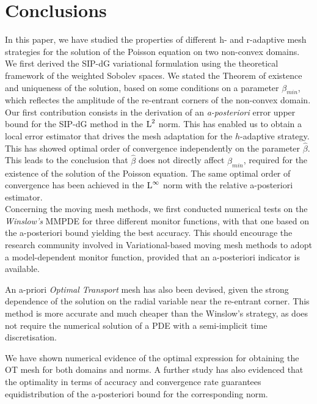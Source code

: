 \documentclass[a4paper,11pt]{article}
\begin{document}
{\clearpage
\newpage

\section{Conclusions}
\label{sec:Conclusion}

In this paper, we have studied the properties of  different h- and r-adaptive mesh strategies for the solution of the Poisson equation on two non-convex domains. We first derived the SIP-dG variational formulation using the theoretical framework of the weighted Sobolev spaces. We stated the Theorem of existence and uniqueness of the solution, based on some conditions on a parameter $\beta_{min}$, which reflectes the amplitude of the re-entrant corners of the non-convex domain.\\

Our first contribution consists in the derivation of an \textit{a-posteriori} error upper bound for the SIP-dG method in the $\operatorname L^{2}$ norm. This has enabled us to obtain a local error estimator that drives the mesh adaptation for the $h$-adaptive strategy. This has showed optimal order of convergence independently on the parameter $\hat{\beta}$. This leads to the conclusion that $\hat{\beta}$ does not directly affect $\beta_{min}$, required for the existence of the solution of the Poisson equation. The same optimal order of convergence has been achieved in the $\operatorname L^{\infty}$ norm with the relative a-posteriori estimator.\\

Concerning the moving mesh methods, we first conducted numerical tests on the \textit{Winslow's} MMPDE for three different monitor functions, with that one based on the a-posteriori bound yielding the best accuracy. This should encourage the research community involved in Variational-based moving mesh methods to adopt a model-dependent monitor function, provided that an a-posteriori indicator is available.

An a-priori \textit{Optimal Transport} mesh has also been devised, given the strong dependence of the solution on the radial variable near the re-entrant corner. This method is more accurate and much cheaper  than the Winslow's strategy, as does not require the numerical solution of a PDE with a semi-implicit time discretisation.

We have shown numerical evidence of the optimal expression for obtaining the OT mesh for both domains and norms. A further study has also evidenced that the optimality in terms of accuracy and convergence rate guarantees equidistribution of the a-posteriori bound for the corresponding norm.

}
\end{document}
